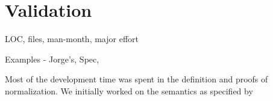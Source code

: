 \documentclass[sigplan,10pt,anonymous,review,nonacm]{acmart}
\begin{document}






\section{Validation}\label{sec:valid}
LOC, files, man-month, major effort

Examples - Jorge's, Spec,

Most of the development time was spent in the definition and proofs of normalization.
We initially worked on the semantics as specified by \cite{gqlph}







\end{document}
